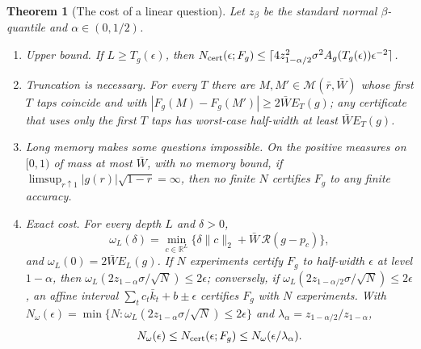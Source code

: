 \documentclass[12pt]{article}
\newtheorem{theorem}{Theorem}[section]
\theoremstyle{definition}
\theoremstyle{remark}
\begin{document}
\begin{theorem}[The cost of a linear question]\label{thm:questions}
Let $z_\beta$ be the standard normal $\beta$-quantile and $\alpha\in(0,1/2)$.
\begin{enumerate}[label=(\roman*)]
\item \emph{Upper bound.} If $L\ge T_g(\epsilon)$, then $N_{\rm cert}(\epsilon;F_g)\le\lceil4z_{1-\alpha/2}^2\sigma^2A_g(T_g(\epsilon))\epsilon^{-2}\rceil$.
\item \emph{Truncation is necessary.} For every $T$ there are $M,M'\in\mathcal M(\bar r,\bar W)$ whose first $T$ taps coincide and with $|F_g(M)-F_g(M')|\ge2\bar WE_T(g)$; any certificate that uses only the first $T$ taps has worst-case half-width at least $\bar WE_T(g)$.
\item \emph{Long memory makes some questions impossible.} On the positive measures on $[0,1)$ of mass at most $\bar W$, with no memory bound, if $\limsup_{r\uparrow1}|g(r)|\sqrt{1-r}=\infty$, then no finite $N$ certifies $F_g$ to any finite accuracy.
\item \emph{Exact cost.} For every depth $L$ and $\delta>0$,
\[
 \omega_L(\delta)=\min_{c\in\mathbb R^L}\bigl\{\delta\|c\|_2+\bar W\,\mathcal R(g-p_c)\bigr\},
\]
and $\omega_L(0)=2\bar WE_L(g)$. If $N$ experiments certify $F_g$ to half-width $\epsilon$ at level $1-\alpha$, then $\omega_L(2z_{1-\alpha}\sigma/\sqrt N)\le2\epsilon$; conversely, if $\omega_L(2z_{1-\alpha/2}\sigma/\sqrt N)\le2\epsilon$, an affine interval $\sum_tc_t\bar k_t+b\pm\epsilon$ certifies $F_g$ with $N$ experiments. With $N_\omega(\epsilon)=\min\{N:\omega_L(2z_{1-\alpha}\sigma/\sqrt N)\le2\epsilon\}$ and $\lambda_\alpha=z_{1-\alpha/2}/z_{1-\alpha}$,
\[
 N_\omega(\epsilon)\le N_{\rm cert}(\epsilon;F_g)\le N_\omega(\epsilon/\lambda_\alpha).
\]
\end{enumerate}
\end{theorem}
\end{document}
